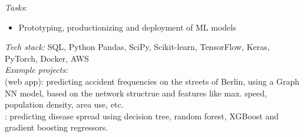 \documentclass[
	a4paper,
]{fortysecondscv}
\begin{document}
\begin{cvtable}[1.0]

	{\href{https://datascienceretreat.com}{\color{pblue}{Data Science Retreat, Germany}}}
	{\textit{Tasks}: 
    \begin{itemize}[topsep=0pt,itemsep=0pt,partopsep=0pt, parsep=0pt, leftmargin=*]
     \setlength\itemsep{1mm}
     \item Prototyping, productionizing and deployment of ML models
    \end{itemize}
    \textit{Tech stack:} SQL, Python Pandas, SciPy, Scikit-learn, TensorFlow, Keras, PyTorch, Docker, AWS\\
    \textit{Example projects:}\\
    \href{https://onurkerimoglu-accind-routepr-accind-route-prediction-app-objw0o.streamlit.app//}{\color{pblue}{AccIndex}} (web app): predicting accident frequencies on the streets of Berlin, using a Graph NN model, based on the network structrue and features like max. speed, population density, area use, etc.\\
    \href{https://github.com/OnurKerimoglu/Dengue}{\color{pblue}{Dengue}}: predicting disease spread using decision tree, random forest, XGBoost and gradient boosting regressors.
    }
    

\end{cvtable}
\end{document}
